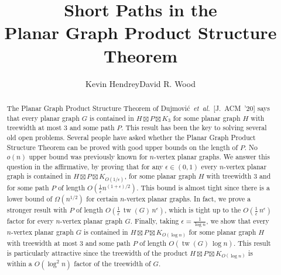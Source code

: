 \documentclass[11pt]{article}
\DeclareMathOperator{\tw}{tw}
\renewcommand{\thefootnote}{\fnsymbol{footnote}}
\theoremstyle{plain}
\theoremstyle{definition}
\begin{document}
	
    \title{\bf Short Paths in the \\
    Planar Graph Product Structure Theorem}
	
    \author{Kevin Hendrey\footnotemark[2] 
    \qquad David R. Wood\footnotemark[2] }
	
    \maketitle
	
	
	\begin{abstract}
		The Planar Graph Product Structure Theorem of Dujmovi\'c~\emph{et~al.}~[J.~ACM~'20] says that every planar graph $G$ is contained in $H\boxtimes P\boxtimes K_3$ for some planar graph $H$ with treewidth at most 3 and some path $P$. This result has been the key to solving several old open problems. Several people have asked whether the  Planar Graph Product Structure Theorem can be proved with good upper bounds on the length of $P$. No $o(n)$ upper bound was previously known for $n$-vertex planar graphs.     We answer this question in the affirmative, by proving that for any $\epsilon\in (0,1)$ every $n$-vertex planar graph is contained in $H\boxtimes P\boxtimes K_{O(1/\epsilon)}$, for some planar graph $H$ with treewidth 3 and for some path $P$ of length $O(\frac{1}{\epsilon}n^{(1+\epsilon)/2})$. This bound is almost tight since there is a lower bound of $\Omega(n^{1/2})$ for certain $n$-vertex planar graphs.  In fact, we prove a stronger result with $P$ of length $O(\frac{1}{\epsilon}\,\tw(G)\,n^{\epsilon})$, which is tight up to the $O(\frac{1}{\epsilon}\,n^{\epsilon})$ factor for every $n$-vertex planar graph $G$. Finally, taking $\epsilon=\frac{1}{\log n}$, we show that every $n$-vertex planar graph $G$ is contained in $H\boxtimes P\boxtimes K_{O(\log n)}$ for some planar graph $H$ with treewidth at most 3 and some path $P$ of length $O(\tw(G)\,\log n)$. This result is particularly attractive since the treewidth of the product $H\boxtimes P\boxtimes K_{O(\log n)}$ is within a $O(\log^2n)$ factor of the treewidth of $G$. 
	\end{abstract}
	
	\newpage
	
	\renewcommand*{\thefootnote}{\arabic{footnote}}
	
\end{document}
